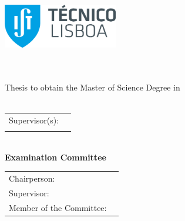 
\begin{titlepage}
\includegraphics[width=5cm]{images/ist_logo}~\\[2.0cm]
\begin{center}
{\LARGE \textbf{\Title}}\\[1.0cm]
{\Large \textbf{\StudentName}}\\[1.0cm]
{\large Thesis to obtain the Master of Science Degree in }\\[1.0cm]
{\LARGE \textbf{\DegreeName}}\\[1.0cm]

\begin{center}
{
\begin{tabular}{ll}
	{\large Supervisor(s):\:} & \Supervisorsf \\
							  & \Supervisorss \\
\end{tabular}
}\\[1.0cm]
{\Large \textbf{Examination Committee}}\\[.25cm]
{
\begin{tabular}{ll}
	{\large Chairperson:\:} & \Chairperson \\
	{\large Supervisor:\:} & \Advisor \\
	{\large Member of the Committee:\:} & \CommitteeMembers \\
\end{tabular}
}
\end{center}\\[1.0cm]

{\Large \textbf{\Month\:\Year}}\\
\end{center}
\end{titlepage}